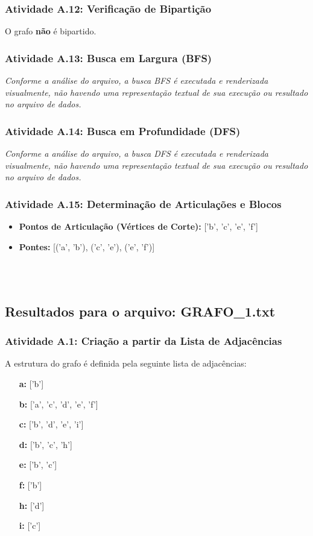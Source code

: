 \documentclass[a4paper,12pt]{article}
\begin{document}
\subsubsection*{Atividade A.12: Verificação de Bipartição}
O grafo \textbf{não} é bipartido.

\subsubsection*{Atividade A.13: Busca em Largura (BFS)}
\textit{Conforme a análise do arquivo, a busca BFS é executada e renderizada visualmente, não havendo uma representação textual de sua execução ou resultado no arquivo de dados.}

\subsubsection*{Atividade A.14: Busca em Profundidade (DFS)}
\textit{Conforme a análise do arquivo, a busca DFS é executada e renderizada visualmente, não havendo uma representação textual de sua execução ou resultado no arquivo de dados.}

\subsubsection*{Atividade A.15: Determinação de Articulações e Blocos}
\begin{itemize}[nosep, leftmargin=*]
    \item \textbf{Pontos de Articulação (Vértices de Corte):} ['b', 'c', 'e', 'f']
    \item \textbf{Pontes:} [('a', 'b'), ('c', 'e'), ('e', 'f')]
\end{itemize}

\\ \\

\subsection{Resultados para o arquivo: GRAFO\_1.txt}

\subsubsection*{Atividade A.1: Criação a partir da Lista de Adjacências}
A estrutura do grafo é definida pela seguinte lista de adjacências:
\begin{itemize}[leftmargin=*]
    \item[\textbf{a:}] ['b']
    \item[\textbf{b:}] ['a', 'c', 'd', 'e', 'f']
    \item[\textbf{c:}] ['b', 'd', 'e', 'i']
    \item[\textbf{d:}] ['b', 'c', 'h']
    \item[\textbf{e:}] ['b', 'c']
    \item[\textbf{f:}] ['b']
    \item[\textbf{h:}] ['d']
    \item[\textbf{i:}] ['c']
\end{itemize}
\end{document}
